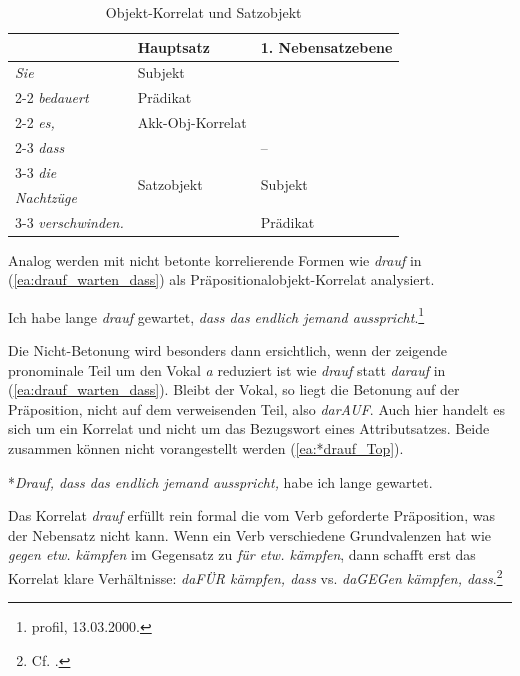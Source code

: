 \begin{table}
  \centering
  \begin{tabular}{l|l|l}
      &  Hauptsatz   &  1. Nebensatzebene \\
    \hline
    \textit{Sie} & Subjekt  & \\ \cline{2-2}
    \textit{bedauert} & Prädikat  & \\ \cline{2-2} 
    \textit{es,} & Akk-Obj-Korrelat & \\ \cline{2-3} 
    \textit{dass} & \multirow{4}{*}{Satzobjekt} & -- \\ \cline{3-3}
    \textit{die} & & \multirow{2}{*}{Subjekt} \\ 
    \textit{Nachtzüge} & & \\ \cline{3-3}
    \textit{verschwinden.} & & Prädikat \\
    \hline 
  \end{tabular}
  \caption{Objekt-Korrelat und Satzobjekt}
  \label{tab:ObjKorr_NeSaObj}
\end{table}

Analog werden mit \citet[157--158]{Breindl1989} nicht betonte korrelierende Formen wie \textit{drauf} in (\ref{ea:drauf_warten_dass}) als Präpositionalobjekt-Korrelat analysiert.

\ea \label{ea:drauf_warten_dass} Ich habe lange \textit{drauf} gewartet, \textit{dass das endlich jemand ausspricht}.\footnote{profil, 13.03.2000.}
\z 

Die Nicht-Betonung wird besonders dann ersichtlich, wenn der zeigende pronominale Teil um den Vokal \textit{a} reduziert ist wie \textit{drauf} statt \textit{darauf} in (\ref{ea:drauf_warten_dass}). Bleibt der Vokal, so liegt die Betonung auf der Präposition, nicht auf dem verweisenden Teil, also \textit{darAUF}. Auch hier handelt es sich um ein Korrelat und nicht um das Bezugswort eines Attributsatzes. Beide zusammen können nicht vorangestellt werden (\ref{ea:*drauf_Top}).

\ea \label{ea:*drauf_Top} *\textit{Drauf, dass das endlich jemand ausspricht,} habe ich lange gewartet.
\z 

Das Korrelat \textit{drauf} erfüllt rein formal die vom Verb geforderte Präposition, was der Nebensatz nicht kann. Wenn ein Verb verschiedene Grundvalenzen hat wie \textit{gegen etw. kämpfen} im Gegensatz zu \textit{für etw. kämpfen}, dann schafft erst das Korrelat klare Verhältnisse: \textit{daFÜR kämpfen, dass} vs. \textit{daGEGen kämpfen, dass}.\footnote{Cf. \citet[186--187]{Bausewein1990}.}    

